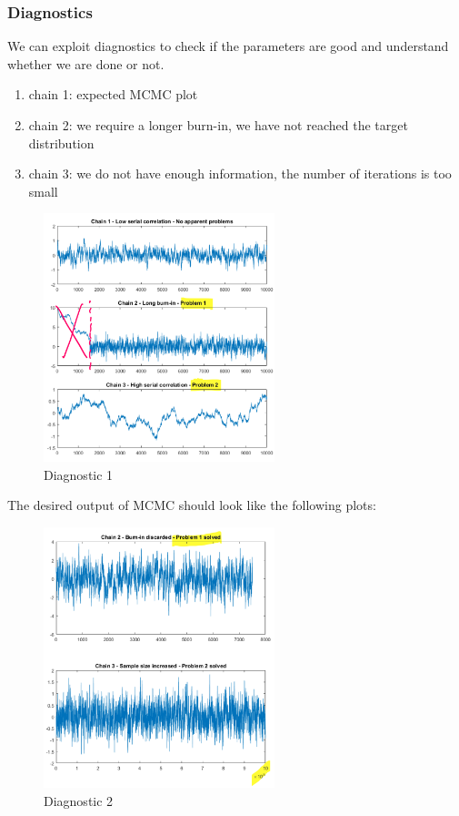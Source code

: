 \subsubsection{Diagnostics}

We can exploit diagnostics to check if the parameters are good and
understand whether we are done or not.

\begin{enumerate}
\def\labelenumi{\arabic{enumi}.}
\tightlist
\item
  chain 1: expected MCMC plot
\item
  chain 2: we require a longer burn-in, we have not reached the target
  distribution
\item
  chain 3: we do not have enough information, the number of iterations
  is too small
\end{enumerate}

\begin{figure}
\centering
\includegraphics[width=0.6\textwidth]{diag_1.png}
\caption{Diagnostic 1}
\end{figure}
\noindent
The desired output of MCMC should look like the following plots:

\begin{figure}
\centering
\includegraphics[width=0.6\textwidth]{diag_2.png}
\caption{Diagnostic 2}
\end{figure}

